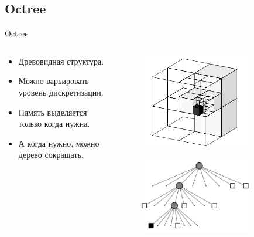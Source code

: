 \documentclass[9pt]{beamer}
\begin{document}
\subsection{Octree}
\begin{frame}{Octree}
  \begin{columns}
    \begin{column}{0.50\textwidth}
      \begin{itemize}
        \item
        {
          Древовидная структура.
        }
        \item
        {
          Можно варьировать уровень дискретизации.
        }
        \item
        {
          Память выделяется только когда нужна.
        }
        \item
        {
          А когда нужно, можно дерево сокращать.
        }
      \end{itemize}
    \end{column}
    \begin{column}{0.40\textwidth}
      \begin{figure}[h]
        \centering
        \includegraphics[width=0.8\textwidth]{octree_cube.png}
      \end{figure}

      \begin{figure}[h]
        \centering
        \includegraphics[width=0.8\textwidth]{octree_tree.png}
      \end{figure}
    \end{column}
  \end{columns}  
\end{frame}
\end{document}
